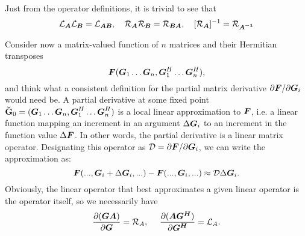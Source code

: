 \documentclass[useAMS,usenatbib]{mn2e}
\makeatletter
\newcommand{\COMPLEX}{\mathbb{C}}
\newcommand{\mat}[1]{{\bmath{#1}}}
\newcommand{\Matrix}[2]{\left [ \begin{array}{@{}#1@{}}#2\end{array} \right ]}
\newcommand{\AUGx}[1]{\mathbf{\breve{#1}}}
\newcommand{\GGg}{\AUGx{G}}
\newcommand{\Rop}[1]{\mathcal{R}_{{#1}}}
\newcommand{\Lop}[1]{\mathcal{L}_{{#1}}}
\numberwithin{equation}{section}
\makeatother
\begin{document}
Just from the operator definitions, it is trivial to see that
\begin{equation}
\label{eq:RAB:LAB}
\Lop{\mat{A}}\Lop{\mat{B}} = \Lop{\mat{AB}},~~~\Rop{\mat{A}}\Rop{\mat{B}} = \Rop{\mat{BA}},~~~[\Rop{\mat{A}}]^{-1} = \Rop{\mat{A^{-1}}}
\end{equation}



Consider now a matrix-valued function of $n$ matrices and their Hermitian transposes
\begin{equation}
\mat{F}(\mat{G}_1\dots\mat{G}_n,\mat{G}^H_1\dots\mat{G}^H_n),
\end{equation}
and think what a consistent definition for the partial matrix derivative $\partial\mat{F}/\partial\mat{G}_i$ 
would need be. A partial derivative at some fixed point $\GGg_0 = (\mat{G}_1\dots\mat{G}_n,\mat{G}^H_1\dots\mat{G}^H_n)$
is a local linear approximation to $\mat{F}$, i.e. a linear function mapping an increment 
in an argument $\Delta\mat{G}_i$ to an increment in the function value $\Delta\mat{F}$. In other words, the partial 
derivative is a linear matrix operator. Designating this operator as $\mathcal{D}=\partial\mat{F}/\partial\mat{G}_i$, we 
can write the approximation as:
\begin{equation}
\mat{F}(...,\mat{G}_i+\Delta\mat{G}_i,...) - \mat{F}(...,\mat{G}_i,...) \approx \mathcal{D} \Delta\mat{G}_i.
\end{equation}
Obviously, the linear operator that best approximates a given linear operator is the operator itself, so we necessarily have
\begin{equation}
\frac{\partial(\mat{GA})}{\partial{\mat{G}}} = \Rop{A},~~~~\frac{\partial(\mat{AG^H})}{\partial{\mat{G^H}}} = \Lop{A}.
\end{equation}
\end{document}
